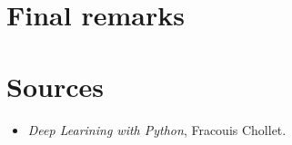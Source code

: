 \documentclass[11pt]{diazessay} %
\begin{document}
\section*{Final remarks}




\section*{Sources}
\begin{itemize}
\item
  \textit{Deep Learining with Python}, Fracouis Chollet.
\end{itemize}

\end{document}
